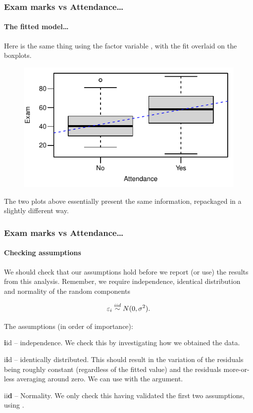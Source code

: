 \documentclass{beamer}\usepackage[]{graphicx}\usepackage[]{xcolor}
\begin{document}
\begin{frame}[fragile]
\frametitle{Exam marks vs Attendance\ldots}
\framesubtitle{The fitted model\ldots}

Here is the same thing using the factor variable , with the fit overlaid on the boxplots.



\begin{figure}
  \centering
  \includegraphics{figure/RC-H05-014}
\end{figure}

The two plots above essentially present the same information, 
repackaged in a slightly different way. 
\end{frame}


\begin{frame}[fragile]
\frametitle{Exam marks vs Attendance\ldots}
\framesubtitle{Checking assumptions}
We should check that our assumptions hold before we report (or use) the results from this analysis. Remember, we require independence, identical distribution and normality of the random components

\[
\varepsilon_i\stackrel{iid}{\sim} N(0,\sigma^2).
\]

The assumptions (in order of importance):

\medskip
\textbf{i}id -- independence. We check this by investigating how we obtained the data.

\medskip
i\textbf{i}d -- identically distributed. This should result in the variation of the residuals being roughly constant (regardless of the fitted value) and the residuals more-or-less averaging around zero.  We can use  with the  argument.
\medskip

ii\textbf{d} -- Normality. We only check this having validated the first two assumptions, using .

\end{frame}
\end{document}
